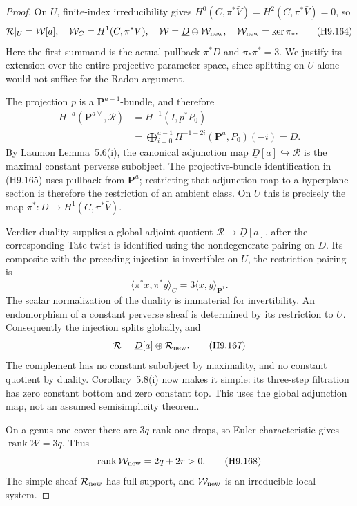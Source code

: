 \begin{proof}
On $U$, finite-index irreducibility gives
$H^0(C,\pi^*\bar V)=H^2(C,\pi^*\bar V)=0$, so
\[
 \mathcal R|_U=\mathcal W[a],\quad
 \mathcal W_C=H^1(C,\pi^*\bar V),\quad
 \mathcal W=\underline D\oplus\mathcal W_{\rm new},\quad
 \mathcal W_{\rm new}=\ker\pi_*.
                                                               \tag{H9.164}
\]
Here the first summand is the actual pullback $\pi^*D$ and
$\pi_*\pi^*=3$. We justify its extension over the entire
projective parameter space, since splitting on $U$ alone
would not suffice for the Radon argument.

The projection $p$ is a $\mathbf P^{a-1}$-bundle, and therefore
\[
 \begin{split}
 H^{-a}(\mathbf P^{a\vee},\mathcal R)
  &=H^{-1}(I,p^*P_0)\\
  &=\bigoplus_{i=0}^{a-1}
       H^{-1-2i}(\mathbf P^a,P_0)(-i)=D.
 \end{split}                                                   \tag{H9.165}
\]
By Laumon Lemma~5.6(i), the canonical adjunction map
$\underline D[a]\hookrightarrow\mathcal R$ is the maximal
constant perverse subobject. The projective-bundle
identification in (H9.165) uses pullback from $\mathbf P^a$;
restricting that adjunction map to a hyperplane section is
therefore the restriction of an ambient class. On $U$ this
is precisely the map $\pi^*:D\to H^1(C,\pi^*\bar V)$.

Verdier duality supplies a global adjoint quotient
$\mathcal R\to\underline D[a]$, after the corresponding
Tate twist is identified using the nondegenerate pairing
on $D$. Its composite with the preceding injection is
invertible: on $U$, the restriction pairing is
\[
             \langle\pi^*x,\pi^*y\rangle_C
                     =3\langle x,y\rangle_{\mathbf P^1}.
                                                               \tag{H9.166}
\]
The scalar normalization of the duality is immaterial for
invertibility. An endomorphism of a constant perverse sheaf
is determined by its restriction to $U$. Consequently the
injection splits globally, and
\[
          \mathcal R=\underline D[a]\oplus\mathcal R_{\rm new}.
                                                               \tag{H9.167}
\]
The complement has no constant subobject by maximality, and
no constant quotient by duality. Corollary~5.8(i) now makes
it simple: its three-step filtration has zero constant
bottom and zero constant top. This uses the global
adjunction map, not an assumed semisimplicity theorem.

On a genus-one cover there are $3q$ rank-one drops, so
Euler characteristic gives $\operatorname{rank}\mathcal W=3q$.
Thus
\[
              \operatorname{rank}\mathcal W_{\rm new}=2q+2r>0.
                                                               \tag{H9.168}
\]
The simple sheaf $\mathcal R_{\rm new}$ has full support,
and $\mathcal W_{\rm new}$ is an irreducible local system.


\end{proof}
